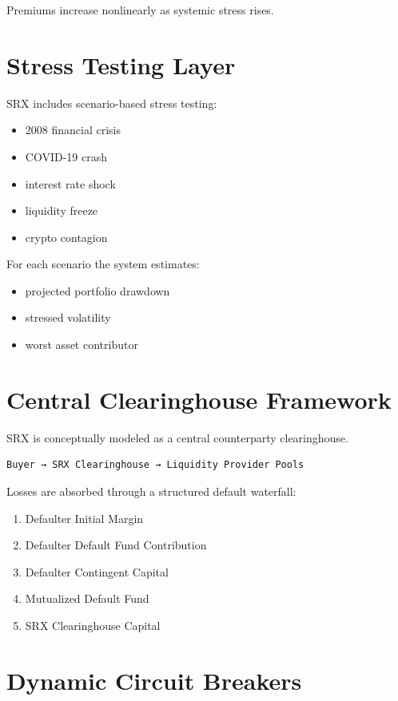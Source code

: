 \documentclass[11pt]{article}
\begin{document}
Premiums increase nonlinearly as systemic stress rises.

\section{Stress Testing Layer}

SRX includes scenario-based stress testing:

\begin{itemize}
\item 2008 financial crisis
\item COVID-19 crash
\item interest rate shock
\item liquidity freeze
\item crypto contagion
\end{itemize}

For each scenario the system estimates:

\begin{itemize}
\item projected portfolio drawdown
\item stressed volatility
\item worst asset contributor
\end{itemize}

\section{Central Clearinghouse Framework}

SRX is conceptually modeled as a central counterparty clearinghouse.

\begin{verbatim}
Buyer → SRX Clearinghouse → Liquidity Provider Pools
\end{verbatim}

Losses are absorbed through a structured default waterfall:

\begin{enumerate}
\item Defaulter Initial Margin
\item Defaulter Default Fund Contribution
\item Defaulter Contingent Capital
\item Mutualized Default Fund
\item SRX Clearinghouse Capital
\end{enumerate}

\section{Dynamic Circuit Breakers}
\end{document}
